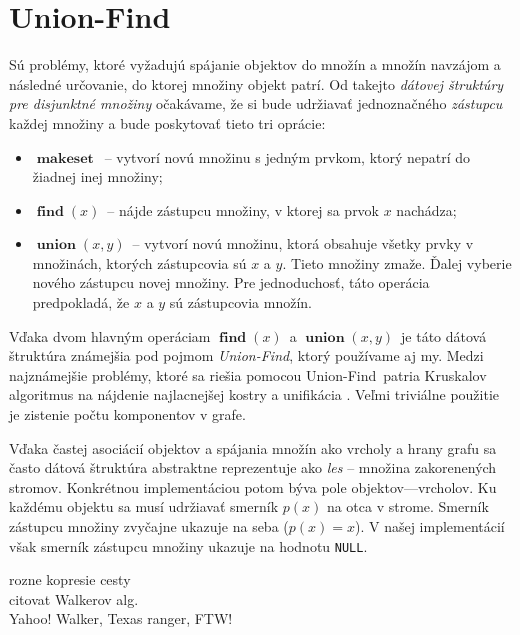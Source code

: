 \def\uf{Union-Find}
\def\null{\texttt{NULL}}
\def\makeset{$\mathop{\mathbf{makeset}}$}
\def\find{$\mathop{\mathbf{find}}(x)$}
\def\union{$\mathop{\mathbf{union}}(x, y)$}

\section{\uf}
Sú problémy, ktoré vyžadujú spájanie objektov do množín a množín navzájom 
a následné určovanie, do ktorej množiny objekt patrí. Od takejto \emph{
dátovej štruktúry pre disjunktné množiny} očakávame, že si bude udržiavať 
jednoznačného \emph{zástupcu} každej množiny a bude poskytovať 
tieto tri oprácie: 
\begin{itemize}
\item \makeset\ -- vytvorí novú množinu s jedným prvkom, ktorý 
nepatrí do žiadnej inej množiny;
\item \find\ -- nájde zástupcu množiny, v ktorej sa 
prvok $x$ nachádza;
\item \union\ -- vytvorí novú množinu, ktorá obsahuje 
všetky prvky v množinách, ktorých zástupcovia sú $x$ a $y$. Tieto 
množiny zmaže. Ďalej vyberie nového zástupcu novej množiny. Pre 
jednoduchosť, táto operácia predpokladá, že $x$ a $y$ sú 
zástupcovia množín.
\end{itemize}
Vďaka dvom hlavným operáciam \find\ a \union\ 
je táto dátová štruktúra známejšia pod pojmom \emph{\uf}, ktorý 
používame aj my. Medzi najznámejšie problémy, ktoré sa riešia pomocou 
\uf\ patria Kruskalov algoritmus na nájdenie najlacnejšej kostry 
\citep{kruskal} a unifikácia \citep{unif}. Veľmi triviálne použitie je 
zistenie počtu komponentov v grafe.

Vďaka častej asociácií objektov a spájania množín ako vrcholy a hrany grafu 
sa často dátová štruktúra abstraktne reprezentuje ako 
\emph{les} -- množina zakorenených stromov. 
Konkrétnou implementáciou potom býva pole objektov---vrcholov. Ku každému 
objektu sa musí udržiavať smerník $p(x)$ na otca v strome. Smerník zástupcu 
množiny zvyčajne ukazuje na seba ($p(x) = x$). V našej implementácií však 
smerník zástupcu množiny ukazuje na hodnotu \null.

rozne kopresie cesty\\
citovat Walkerov alg.
\\
Yahoo! Walker, Texas ranger, FTW!

